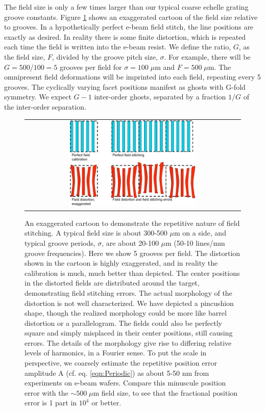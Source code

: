 \documentclass[]{spie}  %
\begin{document}
The field size is only a few times larger than our typical coarse echelle grating groove constants.  Figure \ref{fig:FieldCartoon} shows an exaggerated cartoon of the field size relative to grooves.  In a hypothetically perfect e-beam field stitch, the line positions are exactly as desired.  In reality there is some finite distortion, which is repeated each time the field is written into the e-beam resist.  We define the ratio, $G$, as the field size, $F$, divided by the groove pitch size, $\sigma$.  For example, there will be $G=500/100=5$ grooves per field for $\sigma = 100 \; \mu$m and $F = 500 \; \mu$m.  The omnipresent field deformations will be imprinted into each field, repeating every 5 grooves.  The cyclically varying facet positions manifest as ghosts with G-fold symmetry. We expect $G-1$ inter-order ghosts, separated by a fraction $1/G$ of the inter-order separation.


\begin{figure}
\begin{center}
 \begin{tabular}{c}
    \includegraphics[width=0.6\textwidth]{figs/Field_stitching_errors_alt2.pdf}
   \end{tabular}
  \end{center}
  \caption[Field Stitching Error Cartoon]{\label{fig:FieldCartoon} An exaggerated cartoon to demonstrate the repetitive nature of field stitching.  A typical field size is about 300-500 $\mu$m on a side, and typical groove periods, $\sigma$, are about 20-100 $\mu$m (50-10 lines/mm groove frequencies).  Here we show 5 grooves per field.  The distortion shown in the cartoon is highly exaggerated, and in reality the calibration is much, much better than depicted.  The center positions in the distorted fields are distributed around the target, demonstrating field stitching errors.  The actual morphology of the distortion is not well characterized.  We have depicted a pincushion shape, though the realized morphology could be more like barrel distortion or a parallelogram.  The fields could also be perfectly square and simply misplaced in their center positions, still causing errors.  The details of the morphology give rise to differing relative levels of harmonics, in a Fourier sense.  To put the scale in perspective, we coarsely estimate the repetitive position error amplitude A (cf. eq. \ref{eqn:Periodic}) as about 5-50 nm from experiments on e-beam wafers.  Compare this minuscule position error with the $\sim500 \; \mu$m field size, to see that the fractional position error is 1 part in $10^4$ or better.}
\end{figure}
\end{document}

